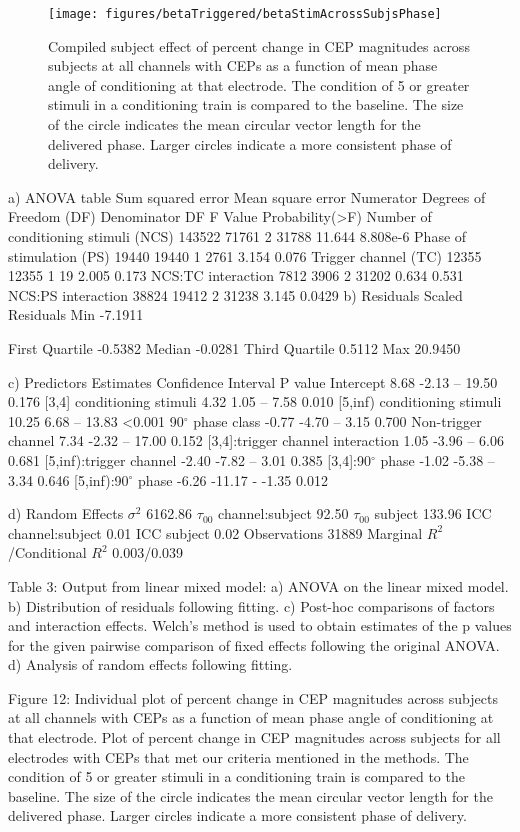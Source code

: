 \begin{figure}[ht]
	\centering
	\texttt{[image: figures/betaTriggered/betaStimAcrossSubjsPhase]}
	\caption[Combined subject CEP modulation]{Compiled subject effect of percent change in CEP magnitudes across subjects at all channels with CEPs as a function of mean phase angle of conditioning at that electrode. The condition of 5 or greater stimuli in a conditioning train is compared to the baseline. The size of the circle indicates the mean circular vector length for the delivered phase. Larger circles indicate a more consistent phase of delivery.  
	}
	\label{fig:betaStimAcrossSubjsPhase}
\end{figure}


a)
ANOVA table 
Sum squared error	Mean square error	Numerator Degrees of Freedom (DF)	Denominator DF	F Value	Probability(>F)
Number of conditioning stimuli (NCS)	143522	71761	2	31788	11.644	8.808e-6
Phase of stimulation (PS)	19440	19440	1	2761	3.154	0.076
Trigger channel (TC)	12355	12355	1	19	2.005	0.173
NCS:TC interaction	7812	3906	2	31202	0.634	0.531
NCS:PS interaction	38824	19412	2	31238	3.145	0.0429
b)
Residuals
Scaled Residuals	Min
-7.1911

First Quartile
-0.5382	Median
-0.0281	Third Quartile
0.5112
Max
20.9450

c)
Predictors	Estimates	Confidence Interval 	P value
Intercept	8.68	-2.13 – 19.50	0.176
[3,4] conditioning stimuli	4.32	1.05 – 7.58	0.010
[5,inf) conditioning stimuli	10.25	6.68 – 13.83	<0.001
90$^\circ$ phase class	-0.77	-4.70 – 3.15	0.700
Non-trigger channel	7.34	-2.32 – 17.00	0.152
[3,4]:trigger channel interaction	1.05	-3.96 – 6.06	0.681
[5,inf):trigger channel	-2.40	-7.82 – 3.01	0.385
[3,4]:90$^\circ$  phase	-1.02	-5.38 – 3.34	0.646
[5,inf):90$^\circ$  phase	-6.26	-11.17 - -1.35	0.012

d)
Random Effects
$\sigma^2$	6162.86
$\tau_{00} $ channel:subject	92.50
$\tau_{00} $ subject	133.96
ICC channel:subject	0.01
ICC subject	0.02
Observations	31889
Marginal $R^2$/Conditional $R^2$	0.003/0.039

Table 3: Output from linear mixed model: a) ANOVA on the linear mixed model. b) Distribution of residuals following fitting. c) Post-hoc comparisons of factors and interaction effects. Welch’s method is used to obtain estimates of the p values for the given pairwise comparison of fixed effects following the original ANOVA. d) Analysis of random effects following fitting. 


Figure 12: Individual plot of percent change in CEP magnitudes across subjects at all channels with CEPs as a function of mean phase angle of conditioning at that electrode.
Plot of percent change in CEP magnitudes across subjects for all electrodes with CEPs that met our criteria mentioned in the methods. The condition of 5 or greater stimuli in a conditioning train is compared to the baseline. The size of the circle indicates the mean circular vector length for the delivered phase. Larger circles indicate a more consistent phase of delivery. 


